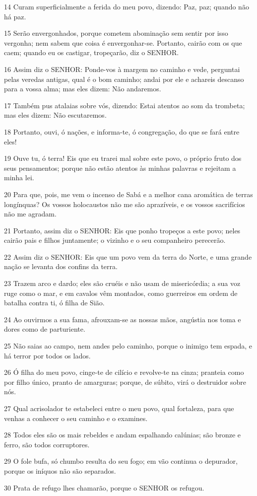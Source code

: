 \par 14 Curam superficialmente a ferida do meu povo, dizendo: Paz, paz; quando não há paz.
\par 15 Serão envergonhados, porque cometem abominação sem sentir por isso vergonha; nem sabem que coisa é envergonhar-se. Portanto, cairão com os que caem; quando eu os castigar, tropeçarão, diz o SENHOR.
\par 16 Assim diz o SENHOR: Ponde-vos à margem no caminho e vede, perguntai pelas veredas antigas, qual é o bom caminho; andai por ele e achareis descanso para a vossa alma; mas eles dizem: Não andaremos.
\par 17 Também pus atalaias sobre vós, dizendo: Estai atentos ao som da trombeta; mas eles dizem: Não escutaremos.
\par 18 Portanto, ouvi, ó nações, e informa-te, ó congregação, do que se fará entre eles!
\par 19 Ouve tu, ó terra! Eis que eu trarei mal sobre este povo, o próprio fruto dos seus pensamentos; porque não estão atentos às minhas palavras e rejeitam a minha lei.
\par 20 Para que, pois, me vem o incenso de Sabá e a melhor cana aromática de terras longínquas? Os vossos holocaustos não me são aprazíveis, e os vossos sacrifícios não me agradam.
\par 21 Portanto, assim diz o SENHOR: Eis que ponho tropeços a este povo; neles cairão pais e filhos juntamente; o vizinho e o seu companheiro perecerão.
\par 22 Assim diz o SENHOR: Eis que um povo vem da terra do Norte, e uma grande nação se levanta dos confins da terra.
\par 23 Trazem arco e dardo; eles são cruéis e não usam de misericórdia; a sua voz ruge como o mar, e em cavalos vêm montados, como guerreiros em ordem de batalha contra ti, ó filha de Sião.
\par 24 Ao ouvirmos a sua fama, afrouxam-se as nossas mãos, angústia nos toma e dores como de parturiente.
\par 25 Não saias ao campo, nem andes pelo caminho, porque o inimigo tem espada, e há terror por todos os lados.
\par 26 Ó filha do meu povo, cinge-te de cilício e revolve-te na cinza; pranteia como por filho único, pranto de amarguras; porque, de súbito, virá o destruidor sobre nós.
\par 27 Qual acrisolador te estabeleci entre o meu povo, qual fortaleza, para que venhas a conhecer o seu caminho e o examines.
\par 28 Todos eles são os mais rebeldes e andam espalhando calúnias; são bronze e ferro, são todos corruptores.
\par 29 O fole bufa, só chumbo resulta do seu fogo; em vão continua o depurador, porque os iníquos não são separados.
\par 30 Prata de refugo lhes chamarão, porque o SENHOR os refugou.

